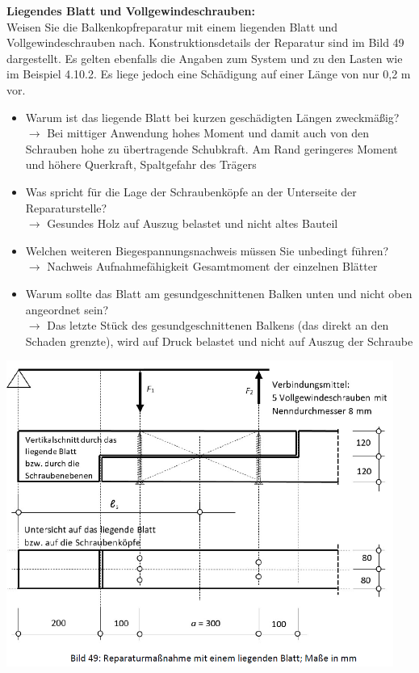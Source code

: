 \documentclass[fleqn,twoside]{article}
\begin{document}
        \vspace{5mm}

        \textbf{Liegendes Blatt und Vollgewindeschrauben:}\\
        Weisen Sie die Balkenkopfreparatur mit einem liegenden Blatt und Vollgewindeschrauben nach. Konstruktionsdetails der Reparatur sind im Bild 49 dargestellt. Es gelten ebenfalls die Angaben zum System und zu den Lasten wie im Beispiel 4.10.2. Es liege jedoch eine Schädigung auf einer Länge von nur 0,2 m vor.
        \begin{minipage}{0.55\textwidth}
            \begin{itemize}
                \item  Warum ist das liegende Blatt bei kurzen geschädigten Längen zweckmäßig?\\
                    $\rightarrow$ Bei mittiger Anwendung hohes Moment und damit auch von den Schrauben hohe zu übertragende Schubkraft. Am Rand geringeres Moment und höhere Querkraft, Spaltgefahr des Trägers
                \item  Was spricht für die Lage der Schraubenköpfe an der Unterseite der Reparaturstelle?\\
                    $\rightarrow$ Gesundes Holz auf Auszug belastet und nicht altes Bauteil
                \item  Welchen weiteren Biegespannungsnachweis müssen Sie unbedingt führen?\\
                    $\rightarrow$ Nachweis Aufnahmefähigkeit Gesamtmoment der einzelnen Blätter 
                \item Warum sollte das Blatt am gesundgeschnittenen Balken unten und nicht oben angeordnet sein?\\
                    $\rightarrow$ Das letzte Stück des gesundgeschnittenen Balkens (das direkt an den Schaden grenzte), wird auf Druck belastet und nicht auf Auszug der Schraube
            \end{itemize}
        \end{minipage}    
        \begin{minipage}{0.45\textwidth}
        \includegraphics[width=0.95\textwidth]{Grafiken/Denkmalpflegerische Arbeit/Balkenkopfreparatur 5.png}
        \end{minipage}
 
\end{document}
